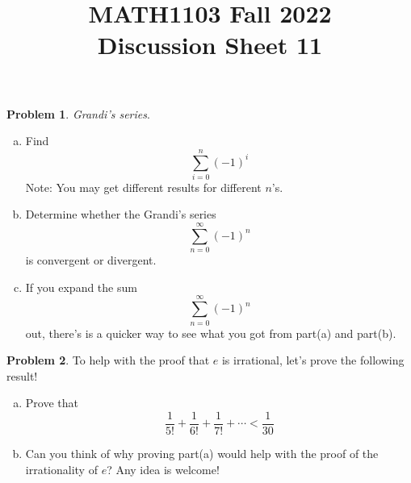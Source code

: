 \documentclass[11pt,oneside]{amsart}
\title{MATH1103 Fall 2022\\
Discussion Sheet 11}
\theoremstyle{definition}
\newtheorem{problem}{Problem}
\begin{document}
    \maketitle
 
    \begin{problem} \textit{Grandi's series}.
    \begin{enumerate}[(a)]
        \item Find $$\sum_{i=0}^n (-1)^i$$
        Note: You may get different results for different $n$'s.
        \vfill
        \item Determine whether the Grandi's series $$\sum_{n=0}^\infty (-1)^n$$ is convergent or divergent.
        \vfill
        \item If you expand the sum $$\sum_{n=0}^\infty (-1)^n$$ out, there's is a quicker way to see what you got from part(a) and part(b).
        \vfill
    \end{enumerate}
    \end{problem}
    \newpage
    \begin{problem} To help with the proof that $e$ is irrational, let's prove the following result!
    \begin{enumerate}[(a)]
        \item Prove that $$\frac{1}{5!}+\frac{1}{6!}+\frac{1}{7!}+\cdots < \frac{1}{30}$$
        \vfill
        \item Can you think of why proving part(a) would help with the proof of the irrationality of $e$? Any idea is welcome!
        \vfill
    \end{enumerate}
    
    \end{problem}
\end{document}
